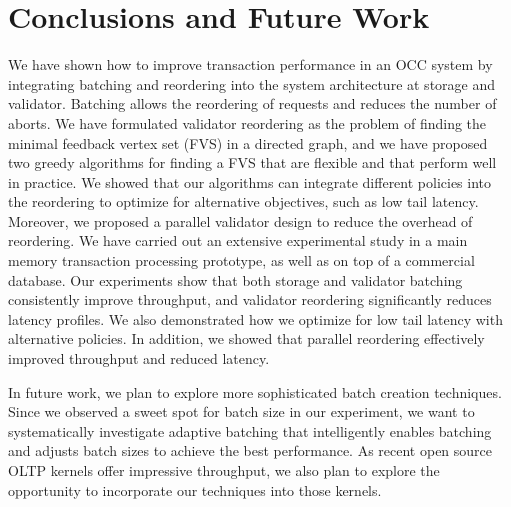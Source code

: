 \section{Conclusions and Future Work}\label{sec:conclusion}
We have shown how to improve transaction performance in an OCC system by integrating batching and reordering into the system architecture at storage and validator. Batching allows the reordering of requests and reduces the number of aborts. We have formulated validator reordering as the problem of finding the minimal feedback vertex set (FVS) in a directed graph, and we have proposed two greedy algorithms for finding a FVS that are flexible and that perform well in practice. We showed that our algorithms can integrate different policies into the reordering to optimize for alternative objectives, such as low tail latency. Moreover, we proposed a parallel validator design to reduce the overhead of reordering. We have carried out an extensive experimental study in a main memory transaction processing prototype, as well as on top of a commercial database. Our experiments show that both storage and validator batching consistently improve throughput, and validator reordering significantly reduces latency profiles. We also demonstrated how we optimize for low tail latency with alternative policies. In addition, we showed that parallel reordering effectively improved throughput and reduced latency.

In future work, we plan to explore more sophisticated batch creation techniques. Since we observed a sweet spot for batch size in our experiment, we want to systematically investigate adaptive batching that intelligently enables batching and adjusts batch sizes to achieve the best performance. As recent open source OLTP kernels offer impressive
throughput, we also plan to explore the opportunity to incorporate our techniques into those kernels.
